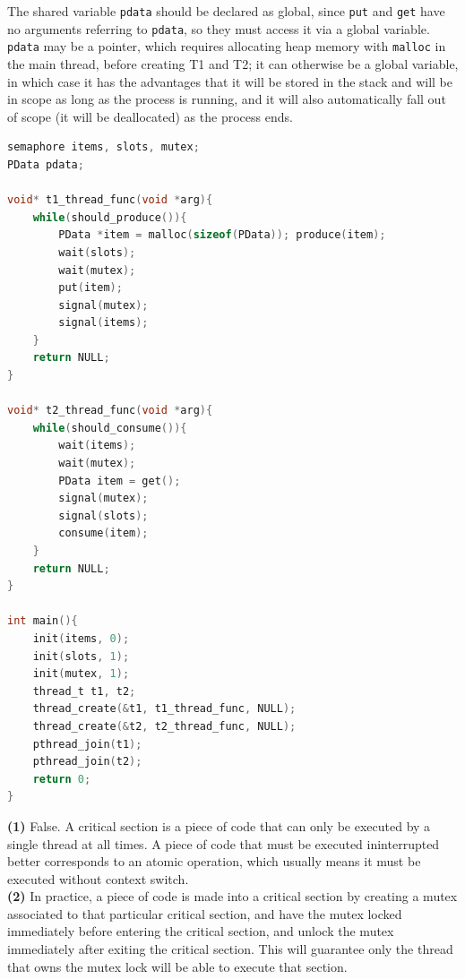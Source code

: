\documentclass{sope}
\begin{document}
The shared variable \texttt{pdata} should be declared as global, since \texttt{put} and \texttt{get} have no arguments referring to \texttt{pdata}, so they must access it via a global variable. \texttt{pdata} may be a pointer, which requires allocating heap memory with \texttt{malloc} in the main thread, before creating T1 and T2; it can otherwise be a global variable, in which case it has the advantages that it will be stored in the stack and will be in scope as long as the process is running, and it will also automatically fall out of scope (it will be deallocated) as the process ends. \par
\begin{lstlisting}[language=C]
semaphore items, slots, mutex;
PData pdata;

void* t1_thread_func(void *arg){
    while(should_produce()){
        PData *item = malloc(sizeof(PData)); produce(item);
        wait(slots);
        wait(mutex);
        put(item);
        signal(mutex);
        signal(items);
    }
    return NULL;
}

void* t2_thread_func(void *arg){
    while(should_consume()){
        wait(items);
        wait(mutex);
        PData item = get();
        signal(mutex);
        signal(slots);
        consume(item);
    }
    return NULL;
}

int main(){
    init(items, 0);
    init(slots, 1);
    init(mutex, 1);
    thread_t t1, t2;
    thread_create(&t1, t1_thread_func, NULL);
    thread_create(&t2, t2_thread_func, NULL);
    pthread_join(t1);
    pthread_join(t2);
    return 0;
}
\end{lstlisting}

\textbf{(1)} False. A critical section is a piece of code that can only be executed by a single thread at all times. A piece of code that must be executed ininterrupted better corresponds to an atomic operation, which usually means it must be executed without context switch.\\
\textbf{(2)} In practice, a piece of code is made into a critical section by creating a mutex associated to that particular critical section, and have the mutex locked immediately before entering the critical section, and unlock the mutex immediately after exiting the critical section. This will guarantee only the thread that owns the mutex lock will be able to execute that section.
\end{document}
